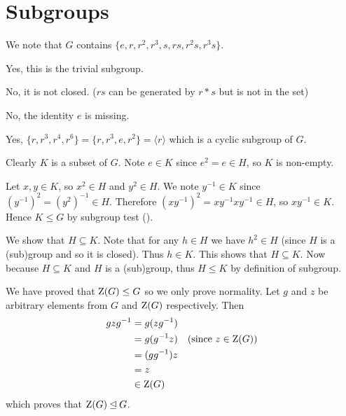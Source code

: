 \section{Subgroups}
\begin{questions}
    \item We note that $G$ contains $\{e, r, r^2, r^3, s, rs, r^2s, r^3s\}$.
    \begin{partquestions}{\alph*}
        \item Yes, this is the trivial subgroup.
        \item No, it is not closed. ($rs$ can be generated by $r \ast s$ but is not in the set)
        \item No, the identity $e$ is missing.
        \item Yes, $\{r, r^3, r^4, r^6\} = \{r, r^3, e, r^2\} = \langle r \rangle$ which is a cyclic subgroup of $G$.
    \end{partquestions}

    \item \begin{partquestions}{\alph*}
        \item Clearly $K$ is a subset of $G$. Note $e \in K$ since $e^2 = e \in H$, so $K$ is non-empty.

        Let $x, y \in K$, so $x^2 \in H$ and $y^2 \in H$. We note $y^{-1} \in K$ since $(y^{-1})^2 = (y^2)^{-1} \in H$. Therefore $(xy^{-1})^2 = xy^{-1}xy^{-1} \in H$, so $xy^{-1} \in K$. Hence $K \leq G$ by subgroup test ().

        \item We show that $H \subseteq K$. Note that for any $h \in H$ we have $h^2 \in H$ (since $H$ is a (sub)group and so it is closed). Thus $h \in K$. This shows that $H \subseteq K$. Now because $H \subseteq K$ and $H$ is a (sub)group, thus $H \leq K$ by definition of subgroup.
    \end{partquestions}

    \item \begin{partquestions}{\alph*}
        \item We have proved that $\mathrm{Z}(G) \leq G$ so we only prove normality. Let $g$ and $z$ be arbitrary elements from $G$ and $\mathrm{Z}(G)$ respectively. Then
        \begin{align*}
            gzg^{-1} &= g(zg^{-1})\\
            &= g(g^{-1}z) & (\text{since }z \in \mathrm{Z}(G))\\
            &= (gg^{-1})z \\
            &= z\\
            &\in \mathrm{Z}(G)
        \end{align*}
        which proves that $\mathrm{Z}(G) \unlhd G$.


\end{partquestions}
\end{questions}

